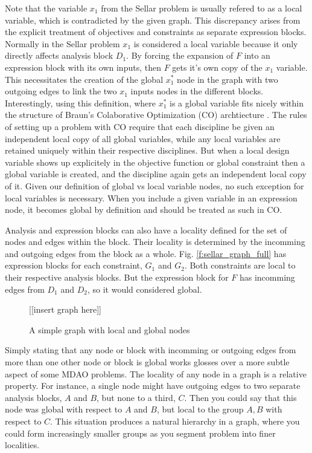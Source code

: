   Note that the variable $x_1$ from the Sellar problem is usually refered to as 
  a local variable, which is contradicted by the given graph. This discrepancy 
  arises from the explicit treatment of objectives and constraints as separate 
  expression blocks. Normally in the Sellar problem $x_1$ is considered a local 
  variable because it only directly affects analysis block $D_1$. By forcing
  the expansion of $F$ into an expression block with its own inputs, then $F$ 
  gets it's own copy of the $x_1$ variable. This necessitates the creation 
  of the global $x_1^*$ node in the graph with two outgoing edges to link the 
  two $x_1$ inputs nodes in the different blocks. Interestingly, using this 
  definition, where $x_1^*$ is a global variable fits nicely within 
  the structure of Braun's Colaborative Optimization (CO) archtiecture \cite{braun_thesis}. 
  The rules of setting up a problem with CO require that each discipline be 
  given an independent local copy of all global variables, while any local 
  variables are retained uniquely within their respective disciplines. But 
  when a local design variable shows up explicitely in the objective function 
  or global constraint then a global variable is created, and the discipline again 
  gets an independent local copy of it. Given our definition of global vs local
  variable nodes, no such exception for local variables is necessary. When you 
  include a given variable in an expression node, it becomes global by definition 
  and should be treated as such in CO. 

  Analysis and expression blocks can also have a locality defined for the set of 
  nodes and edges within the block. Their locality is determined by the 
  incomming and outgoing edges from the block as a whole. Fig. 
  \ref{f:sellar_graph_full} has expression blocks for each constraint, 
  $G_1$ and $G_2$. Both constraints are local to their respective analysis 
  blocks. But the expression block for $F$ has incomming edges from $D_1$ and 
  $D_2$, so it would considered global. 

  \begin{figure}
      \begin{center}
      [[insert graph here]]
      \caption{A simple graph with local and global nodes \label{f:local_global}}
      \end{center}
  \end{figure}

  Simply stating that any node or block with incomming or outgoing edges
  from more than one other node or block is global works glosses over a more 
  subtle aspect of some MDAO problems. The locality of any node in a graph is 
  a relative property. For instance, a single node might have outgoing edges 
  to two separate analysis blocks, $A$ and $B$, but none to a third, $C$. Then 
  you could say that this node was global with respect to $A$ and $B$, but local 
  to the group $A,B$ with respect to $C$. This situation produces a natural 
  hierarchy in a graph, where you could form increasingly smaller groups as you 
  segment problem into finer localities. 

